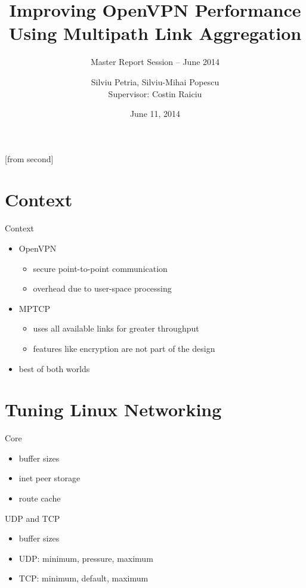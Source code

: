 \documentclass{beamer}
\title[Improving OpenVPN Performance Using Multipath Link
Aggregation]{Improving OpenVPN Performance Using Multipath Link Aggregation}
\subtitle{Master Report Session -- June 2014}
\institute{Faculty of Automatic Control and Computers,\\
	University POLITEHNICA of Bucharest}
\author[Silviu Petria, Silviu-Mihai Popescu]{Silviu Petria, Silviu-Mihai
Popescu\\
	Supervisor: Costin Raiciu}
\date{June 11, 2014}
\begin{document}
[from second]

\frame{\titlepage}

\section{Context}
\begin{frame}{Context}
  \begin{itemize}
    \item OpenVPN
    \begin{itemize}
      \item secure point-to-point communication
      \item overhead due to user-space processing
    \end{itemize}
    \item MPTCP
    \begin{itemize}
      \item uses all available links for greater throughput
      \item features like encryption are not part of the design
    \end{itemize}
    \item best of both worlds
  \end{itemize}
\end{frame}

\section{Tuning Linux Networking}
\begin{frame}{Core}
  \begin{itemize}
    \item buffer sizes
    \item inet peer storage
    \item route cache
  \end{itemize}
\end{frame}

\begin{frame}{UDP and TCP}
  \begin{itemize}
    \item buffer sizes
    \item UDP: minimum, pressure, maximum
    \item TCP: minimum, default, maximum
  \end{itemize}
\end{frame}
\end{document}
